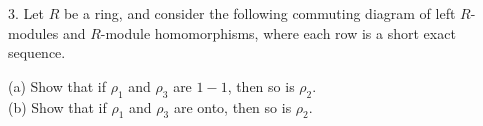 3. Let $R$ be a ring, and consider the following commuting diagram of left $R$-modules and $R$-module
homomorphisms, where each row is a short exact sequence.\\
\begin{center}
\end{center}
(a) Show that if $\rho_1$ and $\rho_3$ are $1-1$, then so is $\rho_2$.\\
(b) Show that if $\rho_1$ and $\rho_3$ are onto, then so is $\rho_2$.\\\\

